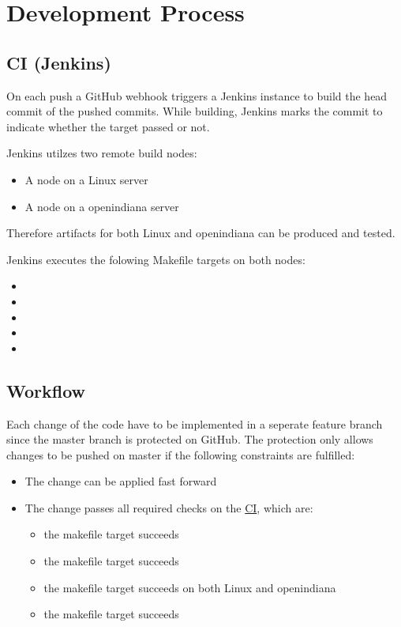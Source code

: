 \section{Development Process}
\subsection{CI (Jenkins)}\label{ci}
On each push a GitHub webhook triggers a Jenkins instance to build the head commit of the pushed commits. While building, Jenkins marks the 
commit to indicate whether the target passed or not.

Jenkins utilzes two remote build nodes: 
\begin{itemize}
	\item A node on a Linux server
	\item A node on a openindiana server 
\end{itemize}
Therefore artifacts for both Linux and openindiana can be produced and tested.

Jenkins executes the folowing Makefile targets on both nodes:
\begin{itemize}
	\item {}
	\item {}
	\item {}
	\item {}
	\item {}
\end{itemize}
\subsection{Workflow}
Each change of the code have to be implemented in a seperate feature branch since the master branch is protected on GitHub. The protection 
only allows changes to be pushed on master if the following constraints are fulfilled:
\begin{itemize}
	\item The change can be applied fast forward
	\item The change passes all required checks on the \hyperref[ci]{CI}, which are:
	\begin{itemize}
		\item the  makefile target succeeds
		\item the  makefile target succeeds
		\item the  makefile target succeeds on both Linux and openindiana
		\item the  makefile target succeeds
	\end{itemize}
\end{itemize}


